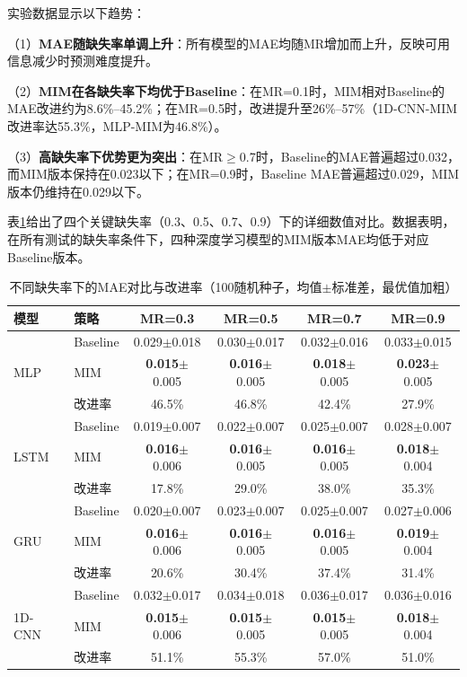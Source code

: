 \documentclass[10pt,a4paper]{ctexart}
\begin{document}
实验数据显示以下趋势：

（1）\textbf{MAE随缺失率单调上升}：所有模型的MAE均随MR增加而上升，反映可用信息减少时预测难度提升。

（2）\textbf{MIM在各缺失率下均优于Baseline}：在MR=0.1时，MIM相对Baseline的MAE改进约为8.6\%--45.2\%；在MR=0.5时，改进提升至26\%--57\%（1D-CNN-MIM改进率达55.3\%，MLP-MIM为46.8\%）。

（3）\textbf{高缺失率下优势更为突出}：在MR$\geq$0.7时，Baseline的MAE普遍超过0.032，而MIM版本保持在0.023以下；在MR=0.9时，Baseline MAE普遍超过0.029，MIM版本仍维持在0.029以下。

表\ref{tab:full_results}给出了四个关键缺失率（0.3、0.5、0.7、0.9）下的详细数值对比。数据表明，在所有测试的缺失率条件下，四种深度学习模型的MIM版本MAE均低于对应Baseline版本。

\begin{table}[H]
\centering
\small
\caption{不同缺失率下的MAE对比与改进率（100随机种子，均值$\pm$标准差，最优值加粗）}
\label{tab:full_results}
\begin{tabular}{@{}llcccc@{}}
\toprule
\textbf{模型} & \textbf{策略} & \textbf{MR=0.3} & \textbf{MR=0.5} & \textbf{MR=0.7} & \textbf{MR=0.9} \\
\midrule
\multirow{3}{*}{MLP} 
& Baseline & 0.029$\pm$0.018 & 0.030$\pm$0.017 & 0.032$\pm$0.016 & 0.033$\pm$0.015 \\
& MIM & \textbf{0.015}$\pm$0.005 & \textbf{0.016}$\pm$0.005 & \textbf{0.018}$\pm$0.005 & \textbf{0.023}$\pm$0.005 \\
& 改进率 & 46.5\% & 46.8\% & 42.4\% & 27.9\% \\
\midrule
\multirow{3}{*}{LSTM} 
& Baseline & 0.019$\pm$0.007 & 0.022$\pm$0.007 & 0.025$\pm$0.007 & 0.028$\pm$0.007 \\
& MIM & \textbf{0.016}$\pm$0.006 & \textbf{0.016}$\pm$0.005 & \textbf{0.016}$\pm$0.005 & \textbf{0.018}$\pm$0.004 \\
& 改进率 & 17.8\% & 29.0\% & 38.0\% & 35.3\% \\
\midrule
\multirow{3}{*}{GRU} 
& Baseline & 0.020$\pm$0.007 & 0.023$\pm$0.007 & 0.025$\pm$0.007 & 0.027$\pm$0.006 \\
& MIM & \textbf{0.016}$\pm$0.006 & \textbf{0.016}$\pm$0.005 & \textbf{0.016}$\pm$0.005 & \textbf{0.019}$\pm$0.004 \\
& 改进率 & 20.6\% & 30.4\% & 37.4\% & 31.4\% \\
\midrule
\multirow{3}{*}{1D-CNN} 
& Baseline & 0.032$\pm$0.017 & 0.034$\pm$0.018 & 0.036$\pm$0.017 & 0.036$\pm$0.016 \\
& MIM & \textbf{0.015}$\pm$0.006 & \textbf{0.015}$\pm$0.005 & \textbf{0.015}$\pm$0.005 & \textbf{0.018}$\pm$0.004 \\
& 改进率 & 51.1\% & 55.3\% & 57.0\% & 51.0\% \\
\bottomrule
\end{tabular}
\end{table}
\end{document}
